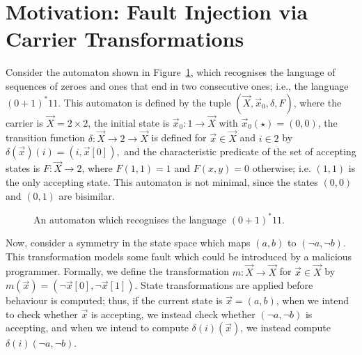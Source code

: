 \section{Motivation: Fault Injection via Carrier Transformations}
\label{sec:Latent:Motivation}

Consider the automaton shown in Figure~\ref{fig:ExampleLatent}, which recognises the language of sequences of zeroes and ones that end in two consecutive ones; i.e., the language $(0+1)^*11$. 
This automaton is defined by the tuple $(\vec{X},\vec{x}_0,\delta,F)$, where the carrier is $\vec{X}=2\times2$, the initial state is $\vec{x}_0\colon1\rightarrow \vec{X}$ with $\vec{x}_0(\star)=(0,0)$, the transition function $\delta\colon \vec{X}\rightarrow 2\rightarrow\vec{X}$ is defined for $\vec{x}\in \vec{X}$ and $i \in 2$ by $\delta(\vec{x})(i)=(i,\vec{x}[0]),$ and the characteristic predicate of the set of accepting states is $F\colon\vec{X}\rightarrow 2$, where $F(1,1)=1$ and $F(x,y)=0$ otherwise; i.e. $(1,1)$ is the only accepting state. This automaton is not minimal, since the states $(0,0)$ and $(0,1)$ are bisimilar.

\begin{figure}[t]
    \centering
    \caption{An automaton which recognises the language $(0+1)^*11$.}
    \label{fig:ExampleLatent}
\end{figure}

Now, %
consider a symmetry in the state space which maps $(a,b)$ to $(\lnot a, \lnot b)$. This transformation models some fault which could be introduced by a malicious programmer. Formally, %
we define the transformation $m\colon \vec{X}\rightarrow\vec{X}$ for $\vec{x}\in \vec{X}$ by $m(\vec{x})=(\lnot \vec{x}[0],\lnot \vec{x}[1])$. 
State transformations are applied before behaviour is computed; thus, if the current state is $\vec{x}=(a,b)$, when we intend to check whether $\vec{x}$ is accepting, we instead check whether $(\lnot a, \lnot b)$ is accepting, and when we intend to compute $\delta(i)(\vec{x})$, we instead compute $\delta(i)(\lnot a, \lnot b)$. 

